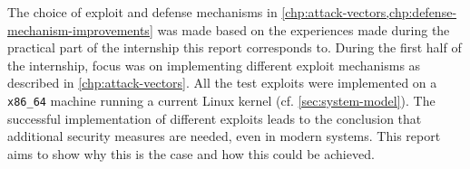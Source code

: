 The choice of exploit and defense mechanisms in \cref{chp:attack-vectors,chp:defense-mechanism-improvements} was made based on the experiences made during the practical part of the internship this report corresponds to.
During the first half of the internship, focus was on implementing different exploit mechanisms as described in \cref{chp:attack-vectors}.
All the test exploits were implemented on a \texttt{x86\_64} machine running a current Linux kernel (cf. \cref{sec:system-model}).
The successful implementation of different exploits leads to the conclusion that additional security measures are needed, even in modern systems.
This report aims to show why this is the case and how this could be achieved.